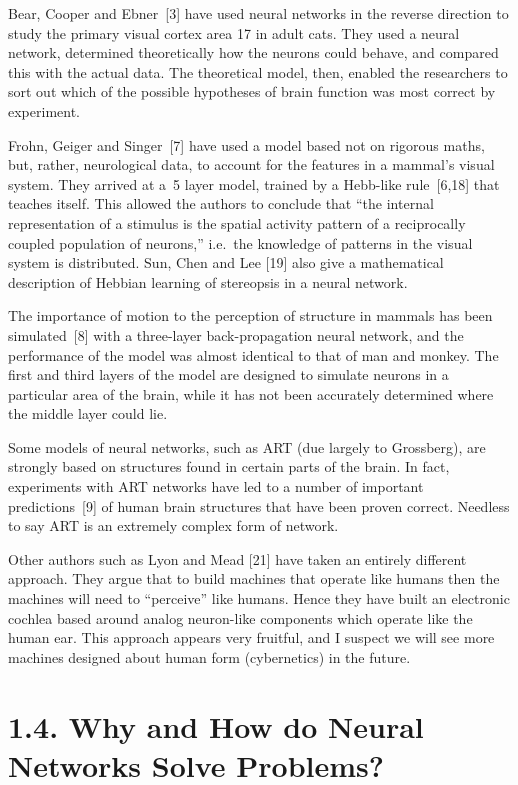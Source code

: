 \documentclass[12pt]{report}
\begin{document}
Bear, Cooper and Ebner~[3] have used neural networks in the reverse direction to
study the primary visual cortex area 17 in adult cats.
They used a neural network, determined theoretically how the neurons could behave,
and compared this with the actual data.
The theoretical model, then, enabled the researchers to sort out which
of the possible hypotheses of brain function was most correct by experiment.

Frohn, Geiger and Singer~[7] have used a model based not on rigorous
maths, but, rather, neurological data, to account for the features in a
mammal's visual system.
They arrived at a~5 layer model, trained by a Hebb-like rule~[6,18] that
teaches itself.
This allowed the authors to conclude that ``the internal representation
of a stimulus is the spatial activity pattern of a reciprocally coupled
population of neurons,'' i.e.\ the knowledge of patterns in the visual system
is distributed.
Sun, Chen and Lee [19] also give a mathematical description of Hebbian
learning of stereopsis in a neural network.

The importance of motion to the perception of structure in mammals has
been simulated~[8] with a three-layer back-propagation neural network, and the
performance of the model was almost identical to that of man and monkey.
The first and third layers of the model are designed to simulate 
neurons in a particular area of the brain, while it has not been accurately
determined where the middle layer could lie. 

Some models of neural networks, such as ART (due largely to Grossberg), are strongly 
based on structures found in certain parts of the brain. 
In fact, experiments with ART networks have led to a number of important
predictions~[9] of human brain structures that have been proven correct.
Needless to say ART is an extremely complex form of network.

Other authors such as Lyon and Mead [21] have taken an entirely different
approach.
They argue that to build machines that operate like humans then the
machines will need to ``perceive'' like humans.
Hence they have built an electronic cochlea based around analog
neuron-like components which operate like the human ear.
This approach appears very fruitful, and I suspect we will see more
machines designed about human form (cybernetics) in the future.

\section{1.4. Why and How do Neural Networks Solve Problems?}
\end{document}
